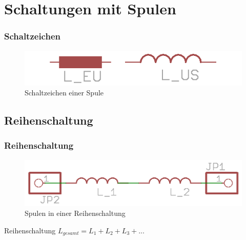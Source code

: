 

\section*{Schaltungen mit Spulen}

\begin{frame}
  \frametitle{Schaltzeichen}
  \begin{center}
    \begin{figure}
      \includegraphics[width=1\textwidth,height=.75\textheight,keepaspectratio]{e06/Spule-schaltZ.png}
      \caption{Schaltzeichen einer Spule}
    \end{figure}
  \end{center}
\end{frame}


\subsection*{Reihen\-schaltung}

\begin{frame}
  \frametitle{Reihenschaltung}
  \begin{center}
    \begin{figure}
      \includegraphics[width=1\textwidth,height=.5\textheight,keepaspectratio]{e06/L_Reihe.png}
      \caption{Spulen in einer Reihenschaltung}
    \end{figure}
  \end{center}
  \begin{block}{Reihenschaltung}
    $L_{gesamt} = L_1 + L_2 + L_3 + ...$
  \end{block}
\end{frame}


